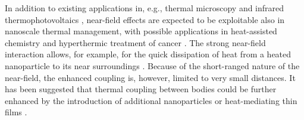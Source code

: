 In addition to existing applications in, e.g., thermal microscopy \cite{majumdar99,muller-hirsch99,kittel05,kittel08} and infrared thermophotovoltaics \cite{dimatteo01,narayanaswamy03,laroche06}, near-field effects are expected to be exploitable also in nanoscale thermal management, with possible applications in heat-assisted chemistry \cite{cao07,adleman09} and hyperthermic treatment of cancer \cite{vanderzee02}. The strong near-field interaction allows, for example, for the quick dissipation of heat from a heated nanoparticle to its near surroundings \cite{mulet01,domingues05}. Because of the short-ranged nature of the near-field, the enhanced coupling is, however, limited to very small distances. It has been suggested that thermal coupling between bodies could be further enhanced by the introduction of additional nanoparticles  \cite{benabdallah11,messina13} or heat-mediating thin films \cite{zheng11,messina12}. 








